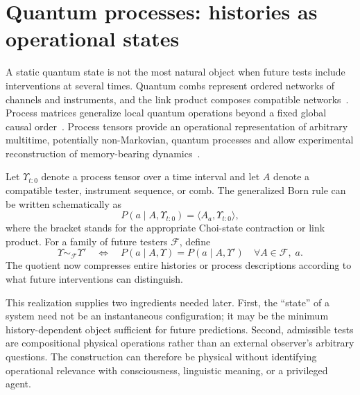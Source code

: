\documentclass[11pt]{article}
\newcommand{\F}{\mathcal F}
\begin{document}
\section{Quantum processes: histories as operational states}
\label{sec:quantum-process}

A static quantum state is not the most natural object when future tests include interventions at several times. Quantum combs represent ordered networks of channels and instruments, and the link product composes compatible networks~\cite{chiribella2008,chiribella2009}. Process matrices generalize local quantum operations beyond a fixed global causal order~\cite{oreshkov2012,costa2016}. Process tensors provide an operational representation of arbitrary multitime, potentially non-Markovian, quantum processes and allow experimental reconstruction of memory-bearing dynamics~\cite{pollock2018pra,pollock2018prl}.

Let $\Upsilon_{t:0}$ denote a process tensor over a time interval and let $A$ denote a compatible tester, instrument sequence, or comb. The generalized Born rule can be written schematically as
\begin{equation}
   P(a\mid A,\Upsilon_{t:0})
   = \langle A_a,\Upsilon_{t:0}\rangle,
   \label{eq:process-born}
\end{equation}
where the bracket stands for the appropriate Choi-state contraction or link product. For a family of future testers $\F$, define
\begin{equation}
 \Upsilon\sim_{\F}\Upsilon'
 \quad\Longleftrightarrow\quad
 P(a\mid A,\Upsilon)=P(a\mid A,\Upsilon')
 \quad\forall A\in\F,\;a.
 \label{eq:process-equivalence}
\end{equation}
The quotient now compresses entire histories or process descriptions according to what future interventions can distinguish.

This realization supplies two ingredients needed later. First, the ``state'' of a system need not be an instantaneous configuration; it may be the minimum history-dependent object sufficient for future predictions. Second, admissible tests are compositional physical operations rather than an external observer's arbitrary questions. The construction can therefore be physical without identifying operational relevance with consciousness, linguistic meaning, or a privileged agent.
\end{document}
